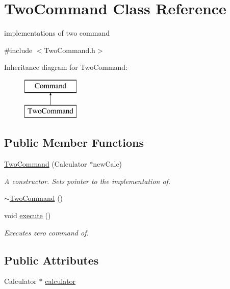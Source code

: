 \hypertarget{class_two_command}{}\section{Two\+Command Class Reference}
\label{class_two_command}


implementations of two command  




{\ttfamily \#include $<$Two\+Command.\+h$>$}

Inheritance diagram for Two\+Command\+:\begin{figure}[H]
\begin{center}
\leavevmode
\includegraphics[height=2.000000cm]{class_two_command}
\end{center}
\end{figure}
\subsection*{Public Member Functions}
\begin{DoxyCompactItemize}
\item 
\hyperlink{class_two_command_a73335d14fe98bc82ef181647b5541aea}{Two\+Command} (Calculator $\ast$new\+Calc)
\begin{DoxyCompactList}\small\item\em A constructor. Sets pointer to the implementation of. \end{DoxyCompactList}\item 
\hyperlink{class_two_command_afbb4f51e3f13eba41b80919307015725}{$\sim$\+Two\+Command} ()
\item 
void \hyperlink{class_two_command_a5065cc2a07c69dcba178c82d7610e29f}{execute} ()
\begin{DoxyCompactList}\small\item\em Executes zero command of. \end{DoxyCompactList}\end{DoxyCompactItemize}
\subsection*{Public Attributes}
\begin{DoxyCompactItemize}
\item 
Calculator $\ast$ \hyperlink{class_two_command_a0242384aa6f8091cc5c413d4e4763cf9}{calculator}
\end{DoxyCompactItemize}


